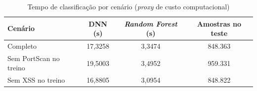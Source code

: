 \begin{table}[htb]
    \centering
    \begin{tabular}{lccc}
        \hline
        \textbf{Cenário}       & \textbf{DNN (s)} & \textbf{\textit{Random Forest} (s)} & \textbf{Amostras no teste} \\
        \hline
        Completo               & 17,3258          & 3,3474                     & 848.363                    \\
        Sem PortScan no treino & 19,5003          & 3,4952                     & 959.331                    \\
        Sem XSS no treino      & 16,8805          & 3,0954                     & 848.822                    \\
        \hline
    \end{tabular}
    \caption{Tempo de classificação por cenário (\textit{proxy} de custo computacional)}
    \label{tab:total_todos_tempo_de_classificacao}
\end{table}
